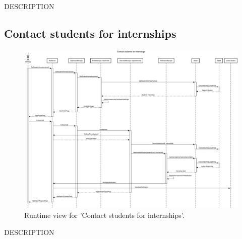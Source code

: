 DESCRIPTION


\subsection{Contact students for internships}
\begin{figure}[H]
    \begin{center}
        \includegraphics[width=0.8\linewidth]{DD/LaTeX/Images/RuntimeView/ContactStudent.png}
        \caption{Runtime view for 'Contact students for internships'.}
        \label{fig:runtime_ContactStudent}%
    \end{center}
\end{figure}

DESCRIPTION

